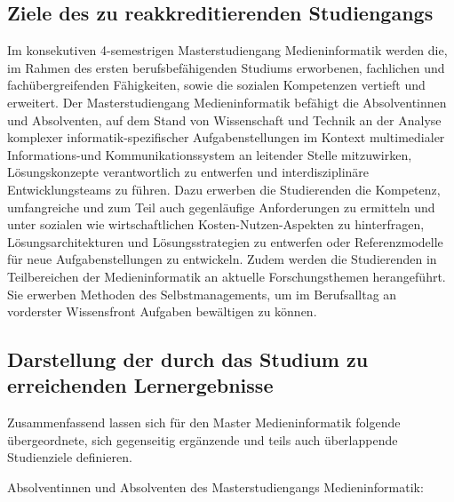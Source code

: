 \subsection{Ziele des zu reakkreditierenden
Studiengangs}\label{ziele-des-zu-reakkreditierenden-studiengangs-1}

Im konsekutiven 4-semestrigen Masterstudiengang Medieninformatik werden
die, im Rahmen des ersten berufsbefähigenden Studiums erworbenen,
fachlichen und fachübergreifenden Fähigkeiten, sowie die sozialen
Kompetenzen vertieft und erweitert. Der Masterstudiengang
Medieninformatik befähigt die Absolventinnen und Absolventen, auf dem
Stand von Wissenschaft und Technik an der Analyse komplexer
informatik-spezifischer Aufgabenstellungen im Kontext multimedialer
Informations-und Kommunikationssystem an leitender Stelle mitzuwirken,
Lösungskonzepte verantwortlich zu entwerfen und interdisziplinäre
Entwicklungsteams zu führen. Dazu erwerben die Studierenden die
Kompetenz, umfangreiche und zum Teil auch gegenläufige Anforderungen zu
ermitteln und unter sozialen wie wirtschaftlichen Kosten-Nutzen-Aspekten
zu hinterfragen, Lösungsarchitekturen und Lösungsstrategien zu entwerfen
oder Referenzmodelle für neue Aufgabenstellungen zu entwickeln. Zudem
werden die Studierenden in Teilbereichen der Medieninformatik an
aktuelle Forschungsthemen herangeführt. Sie erwerben Methoden des
Selbstmanagements, um im Berufsalltag an vorderster Wissensfront
Aufgaben bewältigen zu können.

\subsection{Darstellung der durch das Studium zu erreichenden
Lernergebnisse}\label{darstellung-der-durch-das-studium-zu-erreichenden-lernergebnisse-1}

Zusammenfassend lassen sich für den Master Medieninformatik folgende
übergeordnete, sich gegenseitig ergänzende und teils auch überlappende
Studienziele definieren.

Absolventinnen und Absolventen des Masterstudiengangs Medieninformatik:


